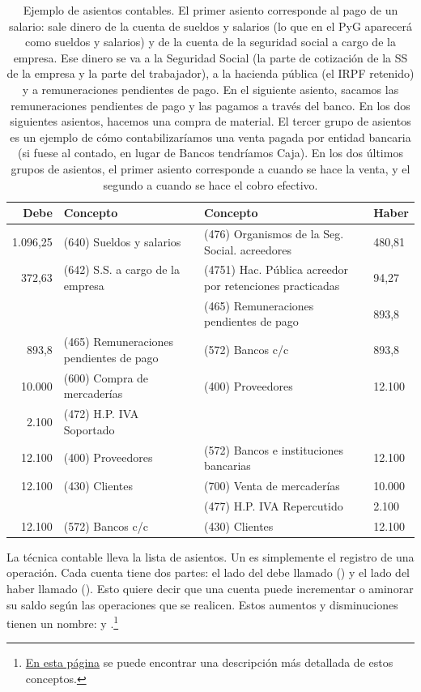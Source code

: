 \documentclass[nochap,palatino,shortheader]{apuntes}
\begin{document}
\begin{table}[hbtp]
\centering
\begin{tabular}{r|p{5cm}||p{5cm}|l}
\textbf{Debe} & \textbf{Concepto} & \textbf{Concepto} & \textbf{Haber} \\ \toprule
1.096,25 & (640) Sueldos y salarios & (476) Organismos de la Seg. Social. acreedores & 480,81 \\
372,63 & (642) S.S. a cargo de la empresa & (4751) Hac. Pública acreedor por retenciones practicadas & 94,27 \\
 & & (465) Remuneraciones pendientes de pago & 893,8 \\ \midrule
 893,8 & (465) Remuneraciones pendientes de pago & (572) Bancos c/c & 893,8 \\ \midrule \midrule
10.000 	& (600) Compra de mercaderías & (400) Proveedores &	12.100 \\
2.100 	& (472) H.P. IVA Soportado & &  \\ \midrule
12.100 	& (400) Proveedores & (572) Bancos e instituciones bancarias &	12.100 \\ \midrule \midrule
12.100 	& (430) Clientes & 	 (700) Venta de mercaderías & 10.000 \\
 & & (477) H.P. IVA Repercutido & 2.100 \\ \midrule
12.100 & (572) Bancos c/c & (430) Clientes & 12.100 \\
 \bottomrule
\end{tabular}
\caption{Ejemplo de asientos contables. El primer asiento corresponde al pago de un salario: sale dinero de la cuenta de sueldos y salarios (lo que en el PyG aparecerá como sueldos y salarios) y de la cuenta de la seguridad social a cargo de la empresa. Ese dinero se va a la Seguridad Social (la parte de cotización de la SS de la empresa y la parte del trabajador), a la hacienda pública (el IRPF retenido) y a remuneraciones pendientes de pago. En el siguiente asiento, sacamos las remuneraciones pendientes de pago y las pagamos a través del banco. En los dos siguientes asientos, hacemos una compra de material. El tercer grupo de asientos es un ejemplo de cómo contabilizaríamos una venta pagada por entidad bancaria (si fuese al contado, en lugar de Bancos tendríamos Caja). En los dos últimos grupos de asientos, el primer asiento corresponde a cuando se hace la venta, y el segundo a cuando se hace el cobro efectivo.}
\label{tab:Asientos}
\end{table}

La técnica contable lleva la lista de asientos. Un  es simplemente el registro de una operación. Cada cuenta tiene dos partes: el lado del debe llamado \textbf{} () y el lado del haber llamado \textbf{} (). 
Esto quiere decir que una cuenta puede incrementar o aminorar su saldo según las operaciones que se realicen. 
Estos aumentos y disminuciones tienen un nombre:  y .\footnote{
 \href{http://www.plangeneralcontable.com/?tit=guia-de-contabilidad-para-torpes&name=GeTia&contentId=man_ctorpes&manPage=8}{En esta página} se puede encontrar una descripción más detallada de estos conceptos.}
\end{document}
